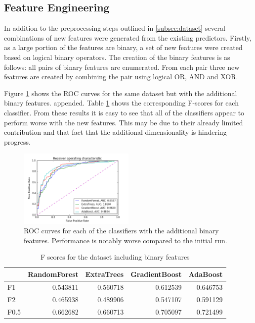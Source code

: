 \documentclass[journal]{IEEEtran}
\begin{document}
\subsection{Feature Engineering}
In addition to the preprocessing steps outlined in \ref{subsec:dataset} several combinations of new features were generated from the existing predictors. Firstly, as a large portion of the features are binary, a set of new features were created based on logical binary operators. The creation of the binary features is as follows: all pairs of binary features are enumerated. From each pair three new features are created by combining the pair using logical OR, AND and XOR.

Figure \ref{fig:roc-binary-features} shows the ROC curves for the same dataset but with the additional binary features. appended. Table \ref{table:f-scores-binary} shows the corresponding F-scores for each classifier. From these results it is easy to see that all of the classifiers appear to perform worse with the new features. This may be due to their already limited contribution and that fact that the additional dimensionality is hindering progress.

\begin{figure}[!t]
\centering
\includegraphics[width=0.5\textwidth]{../src/img/roc_binary_features.png}
\caption{ROC curves for each of the classifiers with the additional binary features. Performance is notably worse compared to the initial run.}
\label{fig:roc-binary-features}
\end{figure}


\begin{table}
\caption{F scores for the dataset including binary features}
\begin{tabular}{lrrrr}
{} &  RandomForest &  ExtraTrees &  GradientBoost &  AdaBoost \\
\hline
F1   &      0.543811 &    0.560718 &       0.612539 &  0.646753 \\
F2   &      0.465938 &    0.489906 &       0.547107 &  0.591129 \\
F0.5 &      0.662682 &    0.660713 &       0.705097 &  0.721499 \\
\end{tabular}
\label{table:f-scores-binary}	
\end{table}
\end{document}
